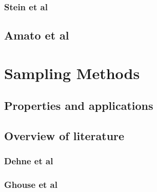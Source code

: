 \documentclass[10pt,a4paper,draft]{report}
\begin{document}
\subsubsection{Stein et al}



\subsection{Amato et al}



\section{Sampling Methods}
\subsection{Properties and applications}
\subsection{Overview of literature}
\subsubsection{Dehne et al}
\subsubsection{Ghouse et al}
\end{document}
